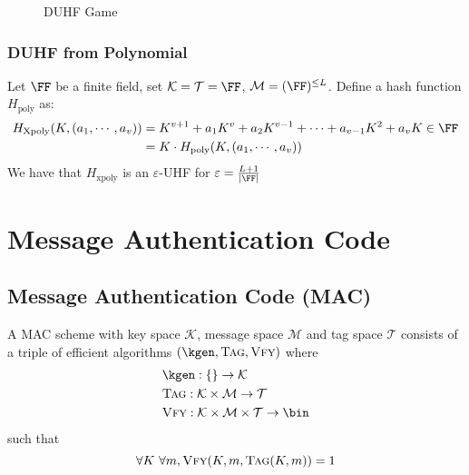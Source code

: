 \documentclass[11pt,a4paper]{article}
\renewcommand{\verify}{\textsc{Vfy}}
\newcommand{\Tag}{\textsc{Tag}}
\begin{document}
\begin{figure}[H]
\begin{pchstack}[center , boxed, space=0.5cm]
\end{pchstack}
\caption{DUHF Game}
\label{fig:duhf-game}
\end{figure}
	

\subsubsection{DUHF from Polynomial}
Let $\FF$ be a finite field, set $\mathcal{K} = \mathcal{T} = \FF$, $\mathcal{M} = (\FF)^{\leq L}$. Define a hash function $H_\text{poly}$ as:
$$
\begin{aligned}
H_\text{Xpoly}(K, (a_1, \cdots, a_v)) &= K^{v+1} + a_1K^{v} + a_2K^{v-1} + \cdots + a_{v-1}K^2 + a_vK \in \FF \\
&= K \cdot H_\text{poly}(K, (a_1, \cdots, a_v))
\end{aligned}
$$
We have that $H_\text{xpoly}$ is an $\varepsilon$-UHF for $\varepsilon = \frac{L+1}{|\FF|}$ 




\newpage
\section{Message Authentication Code}
\subsection{Message Authentication Code (MAC)} A MAC scheme with key space $\mathcal{K}$, message space $\mathcal{M}$ and tag space $\mathcal{T}$ consists of a triple of efficient algorithms $(\kgen, \Tag, \verify)$ where 
$$
\begin{aligned}
&\kgen: \{\} \rightarrow \mathcal{K} \\
&\Tag: \mathcal{K} \times \mathcal{M} \rightarrow \mathcal{T} \\ 
&\verify: \mathcal{K} \times \mathcal{M}\times \mathcal{T} \rightarrow \bin  
\end{aligned}
$$
such that 
$$
\forall K \ \forall m, \verify(K,m,\Tag(K,m) ) = 1
$$
\end{document}
